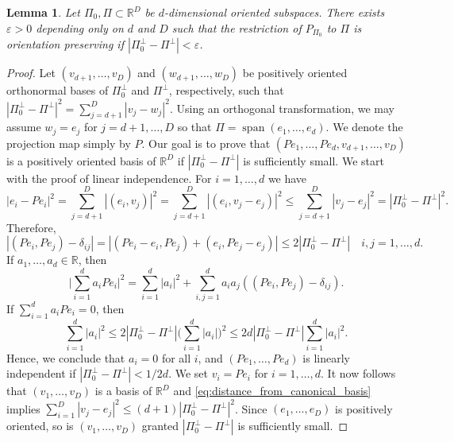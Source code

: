 \documentclass{article}
\numberwithin{equation}{section}
\newtheorem{lemma}[theorem]{Lemma}
\theoremstyle{definition}
\theoremstyle{remark}
\DeclareMathOperator{\lspan}{span}
\begin{document}
\begin{lemma} \label{lm:stability_of_orientation_preservation}
    Let $\Pi_0, \Pi \subset \mathbb{R}^D$ be $d$-dimensional oriented subspaces. There exists $\varepsilon > 0$ depending only on $d$ and $D$ such that the restriction of $P_{\Pi_0}$ to $\Pi$ is orientation preserving if $|\Pi_0^\perp - \Pi^\perp| < \varepsilon$.
\end{lemma}

\begin{proof}
    Let $(v_{d + 1}, \dots, v_D)$ and $(w_{d + 1}, \dots, w_D)$ be positively oriented orthonormal bases of $\Pi_0^\perp$ and $\Pi^\perp$, respectively, such that $|\Pi_0^\perp - \Pi^\perp|^2 = \sum_{j = d + 1}^D |v_j - w_j|^2$. Using an orthogonal transformation, we may assume $w_j = e_j$ for $j = d + 1, \dots, D$ so that $\Pi = \lspan(e_1, \dots, e_d)$. We denote the projection map simply by $P$. Our goal is to prove that $(Pe_1, \dots, Pe_d, v_{d + 1}, \dots, v_D)$ is a positively oriented basis of $\mathbb{R}^D$ if $|\Pi_0^\perp - \Pi^\perp|$ is sufficiently small. We start with the proof of linear independence. For $i = 1, \dots, d$ we have
    \begin{equation} \label{eq:distance_from_canonical_basis}
        |e_i - Pe_i|^2 = \sum_{j = d + 1}^D |(e_i, v_j)|^2 = \sum_{j = d + 1}^D |(e_i, v_j - e_j)|^2 \le \sum_{j = d + 1}^D |v_j - e_j|^2 = |\Pi_0^\perp - \Pi^\perp|^2.
    \end{equation}
    Therefore,
    \[
    |(Pe_i, Pe_j) - \delta_{ij}| = |(Pe_i - e_i, Pe_j) + (e_i, Pe_j - e_j)| \le 2 |\Pi_0^\perp - \Pi^\perp| \quad i, j = 1, \dots, d.
    \]
    If $a_1, \dots, a_d \in \mathbb{R}$, then
    \[
    \Big|\sum_{i = 1}^d a_i Pe_i\Big|^2 = \sum_{i = 1}^d |a_i|^2 + \sum_{i,j = 1}^d a_i a_j((Pe_i, Pe_j) - \delta_{ij}).
    \]
    If $\sum_{i = 1}^d a_i Pe_i = 0$, then
    \[
    \sum_{i = 1}^d |a_i|^2 \le 2 |\Pi_0^\perp - \Pi^\perp| \Big(\sum_{i = 1}^d |a_i|\Big)^2\le 2d |\Pi_0^\perp - \Pi^\perp| \sum_{i = 1}^d |a_i|^2.
    \]
    Hence, we conclude that $a_i = 0$ for all $i$, and $(Pe_1, \dots, Pe_d)$ is linearly independent if $|\Pi_0^\perp - \Pi^\perp| < 1/2d$. We set $v_i = Pe_i$ for $i = 1, \dots, d$. It now follows that $(v_1, \dots, v_D)$ is a basis of $\mathbb{R}^D$ and \eqref{eq:distance_from_canonical_basis} implies $\sum_{i = 1}^D |v_j - e_j|^2 \le (d + 1) |\Pi_0^\perp - \Pi^\perp|^2$. Since $(e_1, \dots, e_D)$ is positively oriented, so is $(v_1, \dots, v_D)$ granted $|\Pi_0^\perp - \Pi^\perp|$ is sufficiently small.
\end{proof}
\end{document}
